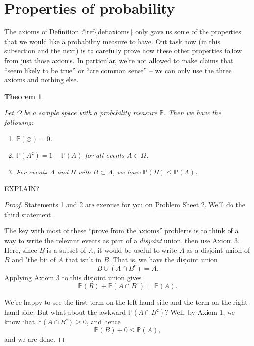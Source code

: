 \documentclass[
  a4paper,
]{book}
\providecommand{\tightlist}{%
  \setlength{\itemsep}{0pt}\setlength{\parskip}{0pt}}
\newtheorem{theorem}{Theorem}[chapter]
\theoremstyle{definition}
\theoremstyle{definition}
\theoremstyle{definition}
\theoremstyle{remark}
\begin{document}
\hypertarget{prob-properties}{%
\section{Properties of probability}\label{prob-properties}}

The axioms of Definition @ref\{def:axioms\} only gave us some of the properties that we would like a probability measure to have. Out task now (in this subsection and the next) is to carefully prove how these other properties follow from just those axioms. In particular, we're not allowed to make claims that ``seem likely to be true'' or ``are common sense'' -- we can only use the three axioms and nothing else.

\begin{theorem}
\protect\hypertarget{thm:unlabeled-div-12}{}\label{thm:unlabeled-div-12}

Let \(\Omega\) be a sample space with a probability measure \(\mathbb P\). Then we have the following:

\begin{enumerate}
\def\labelenumi{\arabic{enumi}.}
\tightlist
\item
  \(\mathbb P(\varnothing) = 0\).
\item
  \(\mathbb P(A^\mathsf{c}) = 1 - \mathbb P(A)\) for all events \(A \subset \Omega\).
\item
  For events \(A\) and \(B\) with \(B \subset A\), we have \(\mathbb P(B) \leq \mathbb P(A)\).
\end{enumerate}

\end{theorem}

EXPLAIN?

\begin{proof}

Statements 1 and 2 are exercise for you on \protect\hyperlink{P2}{Problem Sheet 2}. We'll do the third statement.

The key with most of these ``prove from the axioms'' problems is to think of a way to write the relevant events as part of a \emph{disjoint} union, then use Axiom 3. Here, since \(B\) is a subset of \(A\), it would be useful to write \(A\) as a disjoint union of \(B\) and "the bit of \(A\) that isn't in \(B\). That is, we have the disjoint union
\[ B \cup (A \cap B^\mathsf{c}) = A .\]
Applying Axiom 3 to this disjoint union gives
\[ \mathbb P(B) + \mathbb P(A \cap B^\mathsf{c}) = \mathbb P(A) . \]

We're happy to see the first term on the left-hand side and the term on the right-hand side. But what about the awkward \(\mathbb P(A \cap B^\mathsf{c})\)? Well, by Axiom 1, we know that \(\mathbb P(A \cap B^\mathsf{c}) \geq 0\), and hence
\[ \mathbb P(B) + 0 \leq \mathbb P(A) , \]
and we are done.

\end{proof}
\end{document}
